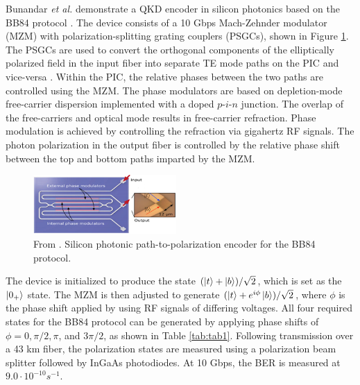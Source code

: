 \documentclass[letterpaper, 10 pt, conference]{ieeeconf}  %
\begin{document}
Bunandar \textit{et al.} demonstrate a QKD encoder in silicon photonics based on the BB84 protocol \cite{metroQKD}. The device consists of a 10 Gbps Mach-Zehnder modulator (MZM) with polarization-splitting grating couplers (PSGCs), shown in Figure \ref{fig:pathencoding}. The PSGCs are used to convert the orthogonal components of the elliptically polarized field in the input fiber into separate TE mode paths on the PIC and vice-versa \cite{PSGC}. Within the PIC, the relative phases between the two paths are controlled using the MZM. The phase modulators are based on depletion-mode free-carrier dispersion implemented with a doped $p$-$i$-$n$ junction. The overlap of the free-carriers and optical mode results in free-carrier refraction. Phase modulation is achieved by controlling the refraction via gigahertz RF signals. The photon polarization in the output fiber is controlled by the relative phase shift between the top and bottom paths imparted by the MZM.

\begin{figure}[!ht]
    \centering
    \includegraphics[width = 0.485\textwidth]{pathencoding.PNG}
    \caption{From \cite{metroQKD}. Silicon photonic path-to-polarization encoder for the BB84 protocol.}
    \label{fig:pathencoding}
\end{figure} 

The device is initialized to produce the state $(\ket{t} + \ket{b})/\sqrt{2}$, which is set as the $\ket{0_+}$ state. The MZM is then adjusted to generate $(\ket{t} + e^{i\phi}\ket{b})/\sqrt{2}$, where $\phi$ is the phase shift applied by using RF signals of differing voltages. All four required states for the BB84 protocol can be generated by applying phase shifts of $\phi = 0, \pi/2, \pi$, and $3\pi/2$, as shown in Table \ref{tab:tab1}. Following transmission over a 43 km fiber, the polarization states are measured using a polarization beam splitter followed by InGaAs photodiodes. At 10 Gbps, the BER is measured at $9.0 \cdot 10^{-10} s^{-1}$.
\end{document}
